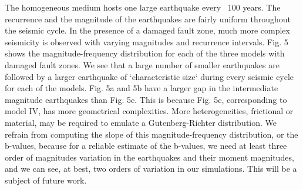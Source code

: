 \documentclass[11pt]{article}
\begin{document}
The homogeneous medium hosts one large earthquake every ~100 years. The recurrence and the magnitude of the earthquakes are fairly uniform throughout the seismic cycle. In the presence of a damaged fault zone, much more complex seismicity is observed with varying magnitudes and recurrence intervals. Fig. 5 shows the magnitude-frequency distribution for each of the three models with damaged fault zones. We see that a large number of smaller earthquakes are followed by a larger earthquake of `characteristic size` during every seismic cycle for each of the models. Fig. 5a and 5b have a larger gap in the intermediate magnitude earthquakes than Fig. 5c. This is because Fig. 5c, corresponding to model IV, has more geometrical complexities. More heterogeneities, frictional or material, may be required to emulate a Gutenberg-Richter distribution. We refrain from computing the slope of this magnitude-frequency distribution, or the b-values, because for a reliable estimate of the b-values, we need at least three order of magnitudes variation in the earthquakes and their moment magnitudes, and we can see, at best, two orders of variation in our simulations. This will be a subject of future work.
\end{document}
